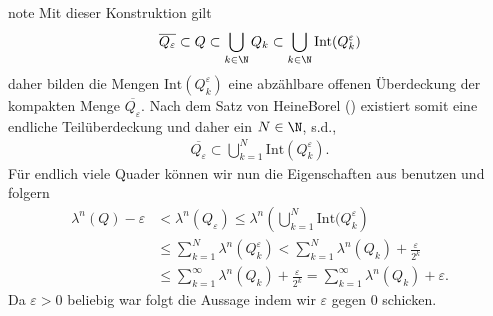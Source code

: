 \documentclass[letterpaper,10pt,english]{jupyterBook}
\begin{document}
\begin{sphinxadmonition}{note}
\sphinxAtStartPar
Mit dieser Konstruktion gilt
\begin{equation*}
\begin{split}\overline{Q_\varepsilon} \subset Q\subset \bigcup_{k\in\N} Q_k \subset 
\bigcup_{k\in\N}\text{Int}(Q_k^\varepsilon)\end{split}
\end{equation*}
\sphinxAtStartPar
daher bilden die Mengen \(\text{Int}(Q_k^\varepsilon)\) eine abzählbare offenen Überdeckung der kompakten Menge \(\overline{Q_\varepsilon}\).
Nach dem Satz von Heine\sphinxhyphen{}Borel ({\hyperref[\detokenize{masstheorie/masstheorie:thm:heineborel}]{}}) existiert somit eine endliche Teilüberdeckung und daher ein \(N\in\N\), s.d.,
\begin{equation*}
\begin{split}\overline{Q_\varepsilon}\subset \bigcup_{k=1}^N\text{Int}(Q_k^\varepsilon).\end{split}
\end{equation*}
\sphinxAtStartPar
Für endlich viele Quader können wir nun die Eigenschaften aus {\hyperref[\detokenize{masstheorie/masstheorie:thm:lebesguevolume}]{}} benutzen und folgern
\begin{equation*}
\begin{split}\lambda^n(Q) -\varepsilon &< \lambda^n(Q_\varepsilon) \leq 
\lambda^n\left(\bigcup_{k=1}^N\text{Int}(Q_k^\varepsilon\right) 
\\&\leq 
\sum_{k=1}^N \lambda^n(Q_k^\varepsilon) < 
\sum_{k=1}^N \lambda^n(Q_k) + \frac{\varepsilon}{2^k} 
\\&\leq
\sum_{k=1}^\infty \lambda^n(Q_k) + \frac{\varepsilon}{2^k} = \sum_{k=1}^\infty \lambda^n(Q_k) +\varepsilon.\end{split}
\end{equation*}
\sphinxAtStartPar
Da \(\varepsilon>0\) beliebig war folgt die Aussage indem wir \(\varepsilon\) gegen \(0\) schicken.


\end{sphinxadmonition}
\end{document}
